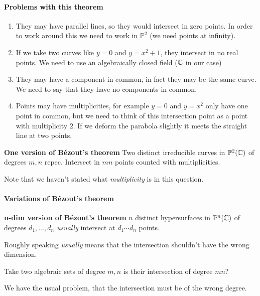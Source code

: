 \paragraph*{Problems with this theorem}\begin{enumerate}
    \item They may have parallel lines, so they would intersect in zero points. In order to work around this we need to work in $\mathbb{P}^2$ (we need points at infinity).
    \item If we take two curves like $y=0$ and $y=x^2+1$, they intersect in no real points. We need to use an algebraically closed field ($\mathbb{C}$ in our case)
    \item They may have a component in common, in fact they may be the same curve. We need to say that they have no components in common.
    \item Points may have multiplicities, for example $y=0$ and $y=x^2$ only have one point in common, but we need to think of this intersection point as a point with multiplicity $2$. If we deform the parabola slightly it meets the straight line at two points.  
\end{enumerate}


\begin{theorem}\textbf{One version of Bézout's theorem}
    Two distinct irreducible curves in $\mathbb{P}^2(\mathbb{C})$ of degrees $m,n$ repec. Intersect in $mn$ points counted with multiplicities.
\end{theorem}

Note that we haven't stated what \textit{multiplicity} is in this question.
\paragraph*{Variations of Bézout's theorem}
\begin{theorem}\textbf{n-dim version of Bézout's theorem}
    $n$ distinct hypersurfaces in $\mathbb{P}^n(\mathbb{C})$ of degrees $d_1,\ldots, d_n$ \textit{usually} intersect at $d_1\cdots d_n$ points.
\end{theorem}
Roughly speaking \textit{usually} means that the intersection shouldn't have the wrong dimension.


\begin{remark}
    Take two algebraic sets of degree $m,n$ is their intersection of degree $mn$?
\end{remark}

We have the usual problem, that the intersection must be of the wrong degree.

